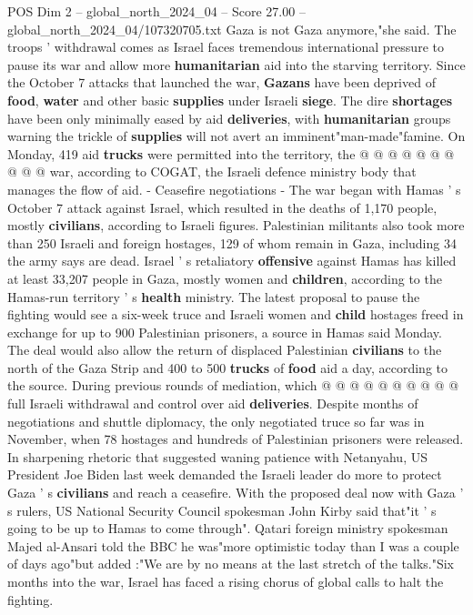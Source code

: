 \begin{textsample}{POS Dim 2 – global\_north\_2024\_04 – Score 27.00 – global\_north\_2024\_04/107320705.txt}
Gaza is not Gaza anymore,"she said.
The troops ' withdrawal comes as Israel faces tremendous international pressure to pause its war and allow more \textbf{humanitarian} aid into the starving territory.
Since the October 7 attacks that launched the war, \textbf{Gazans} have been deprived of \textbf{food}, \textbf{water} and other basic \textbf{supplies} under Israeli \textbf{siege}.
The dire \textbf{shortages} have been only minimally eased by aid \textbf{deliveries}, with \textbf{humanitarian} groups warning the trickle of \textbf{supplies} will not avert an imminent"man-made"famine.
On Monday, 419 aid \textbf{trucks} were permitted into the territory, the @ @ @ @ @ @ @ @ @ @ war, according to COGAT, the Israeli defence ministry body that manages the flow of aid. - Ceasefire negotiations - The war began with Hamas ' s October 7 attack against Israel, which resulted in the deaths of 1,170 people, mostly \textbf{civilians}, according to Israeli figures.
Palestinian militants also took more than 250 Israeli and foreign hostages, 129 of whom remain in Gaza, including 34 the army says are dead.
Israel ' s retaliatory \textbf{offensive} against Hamas has killed at least 33,207 people in Gaza, mostly women and \textbf{children}, according to the Hamas-run territory ' s \textbf{health} ministry.
The latest proposal to pause the fighting would see a six-week truce and Israeli women and \textbf{child} hostages freed in exchange for up to 900 Palestinian prisoners, a source in Hamas said Monday.
The deal would also allow the return of displaced Palestinian \textbf{civilians} to the north of the Gaza Strip and 400 to 500 \textbf{trucks} of \textbf{food} aid a day, according to the source.
During previous rounds of mediation, which @ @ @ @ @ @ @ @ @ @ full Israeli withdrawal and control over aid \textbf{deliveries}.
Despite months of negotiations and shuttle diplomacy, the only negotiated truce so far was in November, when 78 hostages and hundreds of Palestinian prisoners were released.
In sharpening rhetoric that suggested waning patience with Netanyahu, US President Joe Biden last week demanded the Israeli leader do more to protect Gaza ' s \textbf{civilians} and reach a ceasefire.
With the proposed deal now with Gaza ' s rulers, US National Security Council spokesman John Kirby said that"it ' s going to be up to Hamas to come through".
Qatari foreign ministry spokesman Majed al-Ansari told the BBC he was"more optimistic today than I was a couple of days ago"but added :"We are by no means at the last stretch of the talks."Six months into the war, Israel has faced a rising chorus of global calls to halt the fighting.

\end{textsample}
